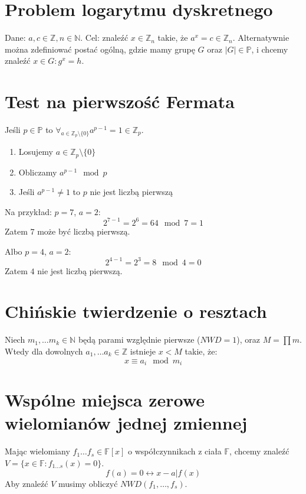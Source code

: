 \documentclass{../notatki}
\begin{document}
\section{Problem logarytmu dyskretnego}

Dane: $a, c \in \mathbb{Z}, n \in \mathbb{N}$. Cel: znaleźć $x \in
\mathbb{Z}_n$ takie, że $a^x = c \in \mathbb{Z}_n$. Alternatywnie można
zdefiniować postać ogólną, gdzie mamy grupę $G$ oraz $|G| \in \mathbb{P}$,
i chcemy znaleźć $x \in G : g^x = h$.

\section{Test na pierwszość Fermata}

Jeśli $p \in \mathbb{P}$ to $\forall_{a \in \mathbb{Z}_p \setminus
\{0\}} a^{p - 1} = 1 \in \mathbb{Z}_p$.

\begin{enumerate}
  \item Losujemy $a \in \mathbb{Z}_p \setminus \{0\}$
  \item Obliczamy $a^{p - 1} \mod p$
  \item Jeśli $a^{p - 1} \ne 1$ to $p$ nie jest liczbą pierwszą
\end{enumerate}

\noindent
Na przykład: $p = 7$, $a = 2$:
$$
2^{7 - 1} = 2^6 = 64 \mod 7 = 1
$$
Zatem $7$ może być liczbą pierwszą.

\noindent
Albo $p = 4$, $a = 2$:
$$
2^{4 - 1} = 2^3 = 8 \mod 4 = 0
$$
Zatem $4$ nie jest liczbą pierwszą.

\section{Chińskie twierdzenie o resztach}

Niech $m_1, \dots m_k \in \mathbb{N}$ będą parami względnie pierwsze
($NWD = 1$), oraz $M = \prod m$. Wtedy dla dowolnych $a_1, \dots a_k
\in \mathbb{Z}$ istnieje $x < M$ takie, że:
$$
x \equiv a_i \mod m_i
$$

\section{Wspólne miejsca zerowe wielomianów jednej zmiennej}

Mając wielomiany $f_1 \dots f_s \in \mathbb{F}[x]$ o współczynnikach
z ciała $\mathbb{F}$, chcemy znaleźć $V = \{x \in \mathbb{F}: f_{1
\dots s}(x) = 0 \}$.
$$
f(a) = 0 \leftrightarrow x - a | f(x)
$$
Aby znaleźć $V$ musimy obliczyć $NWD(f_1, \dots, f_s)$.
\end{document}
